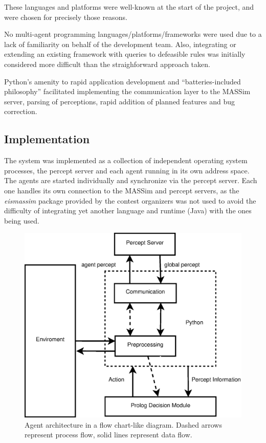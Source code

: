     These languages and platforms were well-known at the start of the project,
    and were chosen for precisely those reasons.
    
    No multi-agent programming languages/platforms/frameworks were used due to 
    a lack of familiarity on behalf of the development team. 
    Also, integrating or extending an existing framework with queries to
    defeasible rules was initially considered more difficult than the
    straighforward approach taken.

    Python's amenity to rapid application development and ``batteries-included 
    philosophy'' facilitated implementing the communication layer to the MASSim 
    server, parsing of perceptions, rapid addition of planned features and bug 
    correction.

\subsection{Implementation}
    The system was implemented as a collection of independent operating system
    processes, the percept server and each agent running in its own address
    space.  The agents are started individually and synchronize via the percept
    server.  Each one handles its own connection to the MASSim and percept
    servers, as the \textit{eismassim} package provided by the contest
    organizers was not used to avoid the difficulty of integrating yet another
    language and runtime (Java) with the ones being used. 
    
    \begin{figure}
    \centering
    \includegraphics[scale=.3]{agentarchitecture.eps}
    \caption{Agent architecture in a flow chart-like diagram. Dashed arrows
    represent process flow, solid lines represent data flow.}
    \label{fig:architecture}
    \end{figure}

